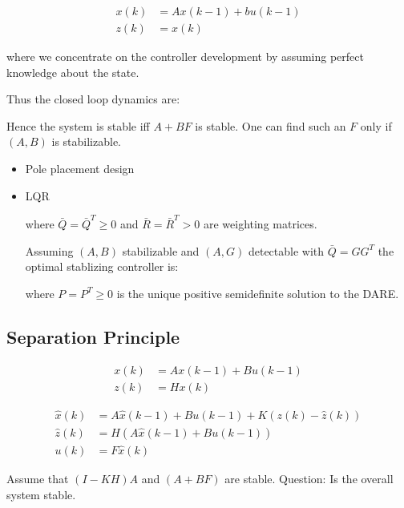 \documentclass[10pt,a4paper]{scrartcl}
\begin{document}
\begin{multicols*}{2}
\begin{align*}
x(k)&=Ax(k-1)+bu(k-1)\\
z(k)&=x(k)
\end{align*}

where we concentrate on the controller development by assuming perfect knowledge about the state.


Thus the closed loop dynamics are:


Hence the system is stable iff $A+BF$ is stable. One can find such an $F$ only if $(A,B)$ is stabilizable.

\begin{itemize}
\item Pole placement design
\item LQR


where $\bar{Q}=\bar{Q}^T\geq 0$ and $\bar{R}=\bar{R}^T>0$ are weighting matrices.

Assuming $(A,B)$ stabilizable and $(A,G)$ detectable with $\bar{Q}=GG^T$ the optimal stablizing controller is:


where $P=P^T\geq 0$ is the unique positive semidefinite solution to the DARE.

\end{itemize}

\subsection{Separation Principle}

\begin{align*}
x(k)&=Ax(k-1)+Bu(k-1)\\
z(k)&=Hx(k)
\end{align*}

\begin{align*}
\hat{x}(k)&=A\hat{x}(k-1)+Bu(k-1)+K(z(k)-\hat{z}(k))\\
\hat{z}(k)&=H(A\hat{x}(k-1)+Bu(k-1))\\
u(k)&=F\hat{x}(k)
\end{align*}

Assume that $(I-KH)A$ and $(A+BF)$ are stable. Question: Is the overall system stable. 


\end{multicols*}
\end{document}
